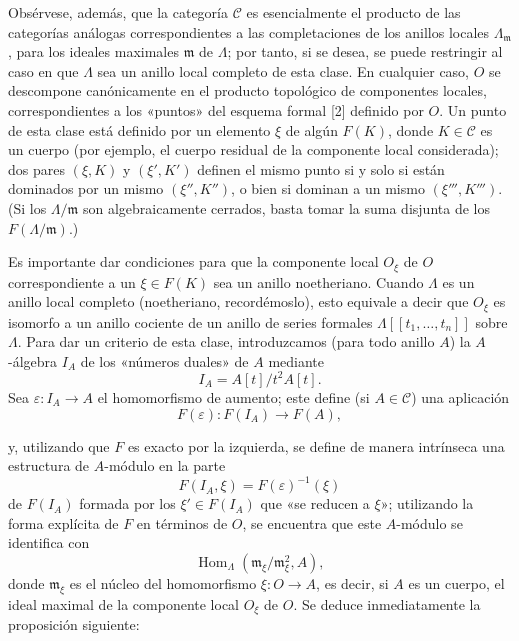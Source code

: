 \documentclass[11pt,twoside,openany]{book}
\numberwithin{equation}{section}
\newcommand{\src}[1]{%
  \phantomsection\hypertarget{src:#1}{}%
  \marginpar{\raggedleft\footnotesize\sffamily #1}%
}
\theoremstyle{plain}
\theoremstyle{definition}
\theoremstyle{remark}
\newcommand{\FgaUnitKey}{frontmatter}
\renewcommand{\src}[1]{%
  \phantomsection\hypertarget{src:\FgaUnitKey:#1}{}%
  \marginpar{\raggedleft\footnotesize\sffamily #1}%
}
\theoremstyle{plain}
\theoremstyle{definition}
\theoremstyle{remark}
\begin{document}
Obsérvese, además, que la categoría $\mathcal C$ es esencialmente el producto
de las categorías análogas correspondientes a las completaciones de los
anillos locales $\Lambda_{\mathfrak m}$, para los ideales maximales
$\mathfrak m$ de $\Lambda$; por tanto, si se desea, se puede restringir al caso
en que $\Lambda$ sea un anillo local completo de esta clase. En cualquier caso,
$O$ se descompone canónicamente en el producto topológico de componentes
locales, correspondientes a los «puntos» del esquema formal [2] definido por
$O$. Un punto de esta clase está definido por un elemento $\xi$ de algún
$F(K)$, donde $K\in\mathcal C$ es un cuerpo (por ejemplo, el cuerpo residual
de la componente local considerada); dos pares $(\xi,K)$ y $(\xi',K')$
definen el mismo punto si y solo si están dominados por un mismo
$(\xi'',K'')$, o bien si dominan a un mismo $(\xi''',K''')$. (Si los
$\Lambda/\mathfrak m$ son algebraicamente cerrados, basta tomar la suma
disjunta de los $F(\Lambda/\mathfrak m)$.)

Es importante dar condiciones para que la componente local $O_\xi$ de $O$
correspondiente a un $\xi\in F(K)$ sea un anillo noetheriano. Cuando $\Lambda$
es un anillo local completo (noetheriano, recordémoslo), esto equivale a decir
que $O_\xi$ es isomorfo a un anillo cociente de un anillo de series formales
$\Lambda[[t_1,\ldots,t_n]]$ sobre $\Lambda$. Para dar un criterio de esta clase,
introduzcamos (para todo anillo $A$) la $A$-álgebra $I_A$ de los «números
duales» de $A$ mediante
\[
  I_A=A[t]/t^2A[t].
\]
Sea $\varepsilon:I_A\longrightarrow A$ el homomorfismo de aumento; este define
(si $A\in\mathcal C$) una aplicación
\[
  F(\varepsilon):F(I_A)\longrightarrow F(A),
\]

\src{376}
y, utilizando que $F$ es exacto por la izquierda, se define de manera
intrínseca una estructura de $A$-módulo en la parte
\[
  F(I_A,\xi)=F(\varepsilon)^{-1}(\xi)
\]
de $F(I_A)$ formada por los $\xi'\in F(I_A)$ que «se reducen a $\xi$»;
utilizando la forma explícita de $F$ en términos de $O$, se encuentra que este
$A$-módulo se identifica con
\[
  \operatorname{Hom}_{\Lambda}(\mathfrak m_\xi/\mathfrak m_\xi^2,A),
\]
donde $\mathfrak m_\xi$ es el núcleo del homomorfismo
$\xi:O\longrightarrow A$, es decir, si $A$ es un cuerpo, el ideal maximal de
la componente local $O_\xi$ de $O$. Se deduce inmediatamente la proposición
siguiente:
\end{document}
